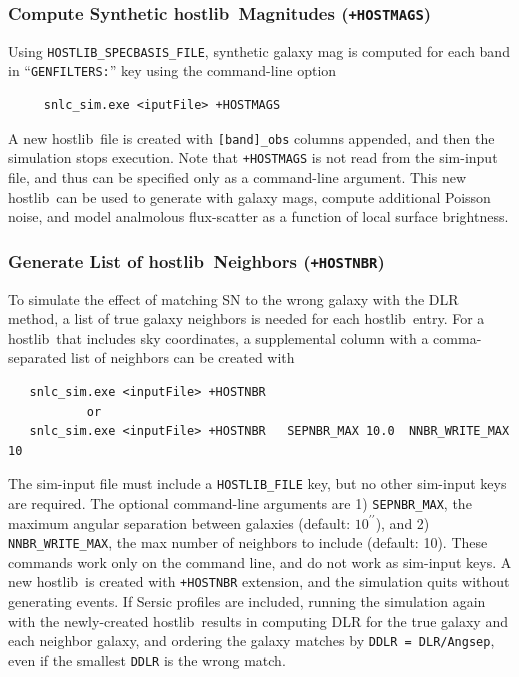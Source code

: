 \documentclass[12pt]{article}
\newcommand{\hostlib}{{\sc hostlib}}
\begin{document}
{\subsubsection{Compute Synthetic \hostlib\ Magnitudes ({\tt +HOSTMAGS})}
\label{sss:hostlib_synmag}

Using {\tt HOSTLIB\_SPECBASIS\_FILE}, synthetic galaxy mag is 
computed for each band in ``{\tt GENFILTERS:}'' key
using the command-line option
\begin{verbatim}
     snlc_sim.exe <iputFile> +HOSTMAGS
\end{verbatim}
A new \hostlib\ file is created with {\tt [band]\_obs} columns appended,
and then the simulation stops execution.
Note that {\tt +HOSTMAGS} is not read from the sim-input file, 
and thus can be specified only as a command-line argument.
This new \hostlib\ can be used to generate with galaxy mags,
compute additional Poisson noise, and model analmolous 
flux-scatter as a function of local surface brightness.

\subsubsection{Generate List of \hostlib\ Neighbors ({\tt +HOSTNBR})}
\label{sss:hostlib_NBR}

To simulate the effect of matching SN to the wrong galaxy 
with the DLR method,
a list of true galaxy neighbors is needed for each \hostlib\ entry. 
For a \hostlib\ that includes sky coordinates, a supplemental 
column with a comma-separated list of neighbors can be created with
%
\begin{verbatim}
   snlc_sim.exe <inputFile> +HOSTNBR
           or
   snlc_sim.exe <inputFile> +HOSTNBR   SEPNBR_MAX 10.0  NNBR_WRITE_MAX 10
\end{verbatim}
%
The sim-input file must include a {\tt HOSTLIB\_FILE} key,
but no other sim-input keys are required.
The optional command-line arguments are 
1) {\tt SEPNBR\_MAX}, the maximum angular separation between galaxies
  (default: $10^{\prime\prime}$), and
2) {\tt NNBR\_WRITE\_MAX}, the max number of neighbors to include
  (default: 10).
These commands work only on the command line, and do not work
as sim-input keys. A new \hostlib\ is created with {\tt +HOSTNBR}
extension, and the simulation quits without generating events.
If Sersic profiles are included, running the simulation again with the 
newly-created \hostlib\ results in computing DLR for the true galaxy and
each neighbor galaxy, and ordering the galaxy matches by 
{\tt DDLR = DLR/Angsep}, 
even if the smallest {\tt DDLR} is the wrong match.

}
\end{document}
